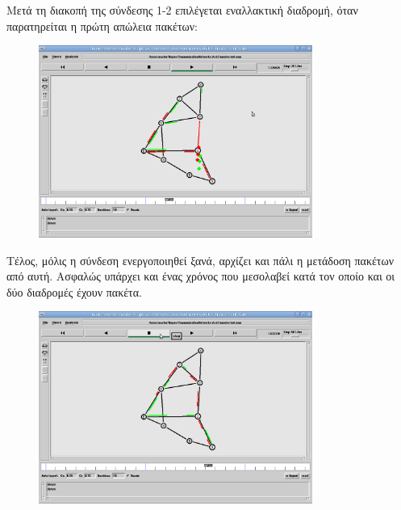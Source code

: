 \documentclass[a4paper,9pt]{article}
\begin{document}
Μετά τη διακοπή της σύνδεσης 1-2 επιλέγεται εναλλακτική διαδρομή, όταν
παρατηρείται η πρώτη απώλεια πακέτων:

\begin{figure}[H]
    \centering
    \includegraphics[width=0.8\textwidth]{files/5.png}
\end{figure}

Τέλος, μόλις η σύνδεση ενεργοποιηθεί ξανά, αρχίζει και πάλι η μετάδοση πακέτων
από αυτή. Ασφαλώς υπάρχει και ένας χρόνος που μεσολαβεί κατά τον οποίο και οι
δύο διαδρομές έχουν πακέτα.

\begin{figure}[H]
    \centering
    \includegraphics[width=0.8\textwidth]{files/6.png}
\end{figure}
\end{document}
